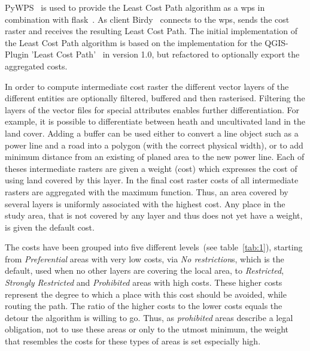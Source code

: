PyWPS~\cite{noauthor_welcome_2016} is used to provide the Least Cost Path algorithm as a \acrfull{wps} in combination with flask~\cite{noauthor_flask_nodate}.
As client Birdy~\cite{noauthor_birdy_nodate} connects to the \acrshort{wps}, sends the cost raster and receives the resulting Least Cost Path.
The initial implementation of the Least Cost Path algorithm is based on the implementation for the QGIS-Plugin
'Least Cost Path'~\cite{noauthor_leastcostpathdijkstra_algorithmpy_2022} in version 1.0, but refactored to optionally export the aggregated costs.

In order to compute intermediate cost raster the different vector layers of the different entities are optionally filtered, buffered and then rasterised.
Filtering the layers of the vector files for special attributes enables further differentiation.
For example, it is possible to differentiate between heath and uncultivated land in the land cover.
Adding a buffer can be used either to convert a line object such as a power line and a road into a polygon (with the
correct physical width), or to add minimum distance from an existing of planed area to the new power line.
Each of theses intermediate rasters are given a weight (cost) which expresses the cost of using land covered by this layer.
In the final cost raster costs of all intermediate rasters are aggregated with the maximum function.
Thus, an area covered by several layers is uniformly associated with the highest cost.
Any place in the study area, that is not covered by any layer and thus does not yet have a weight, is given the default cost.

The costs have been grouped into five different levels~(see table~\ref{tab:1}), starting from \textit{Preferential} areas with
very low costs, via \textit{No restriction}s, which is the default, used when no other layers are covering the local area,
to \textit{Restricted}, \textit{Strongly Restricted} and \textit{Prohibited} areas with high costs.
These higher costs represent the degree to which a place with this cost should be avoided, while routing the path.
The ratio of the higher costs to the lower costs equals the detour
the algorithm is willing to go.
Thus, as \textit{prohibited} areas describe a legal obligation, not to use these areas or only to the utmost minimum,
the weight that resembles the costs for these types of areas is set especially high.\\

